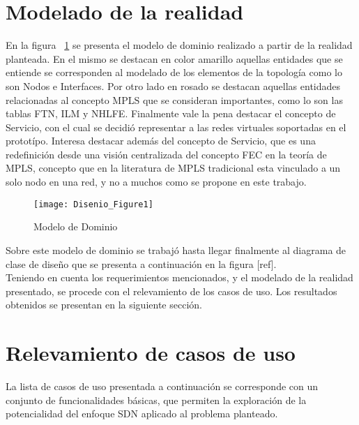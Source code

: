 
\section[Modelado de la realidad]{Modelado de la realidad}

En la figura ~\ref{fig:ModeloDeDominio} se presenta el modelo de dominio realizado a partir de la realidad planteada. En el mismo se destacan en color amarillo aquellas entidades que se entiende se corresponden al modelado de los elementos de la topolog\'ia como lo son Nodos e Interfaces. Por otro lado en rosado se destacan aquellas entidades relacionadas al concepto MPLS que se consideran importantes, como lo son las tablas FTN, ILM y NHLFE. Finalmente vale la pena destacar el concepto de Servicio, con el cual se decidi\'o representar a las redes virtuales soportadas en el protot\'ipo. Interesa destacar adem\'as del concepto de Servicio, que es una redefinici\'on desde una visi\'on centralizada del concepto FEC en la teor\'ia de MPLS, concepto que en la literatura de MPLS tradicional esta vinculado a un solo nodo en una red, y no a muchos como se propone en este trabajo.  

\begin{figure}[ht!] 
\centering    
\texttt{[image: Disenio\_Figure1]}
\caption[ModeloDeDominio]{Modelo de Dominio}
\label{fig:ModeloDeDominio}
\end{figure}

Sobre este modelo de dominio se trabaj\'o hasta llegar finalmente al diagrama de clase de dise\~no que se presenta a continuaci\'on en la figura [ref].\\

Teniendo en cuenta los requerimientos mencionados, y el modelado de la realidad presentado, se procede con el relevamiento de los casos de uso. Los resultados obtenidos se presentan en la siguiente secci\'on.

\section[Relevamiento de casos de uso]{Relevamiento de casos de uso}

La lista de casos de uso presentada a continuaci\'on se corresponde con un conjunto de funcionalidades b\'asicas, que permiten la exploraci\'on de la potencialidad del enfoque SDN aplicado al problema planteado. 

